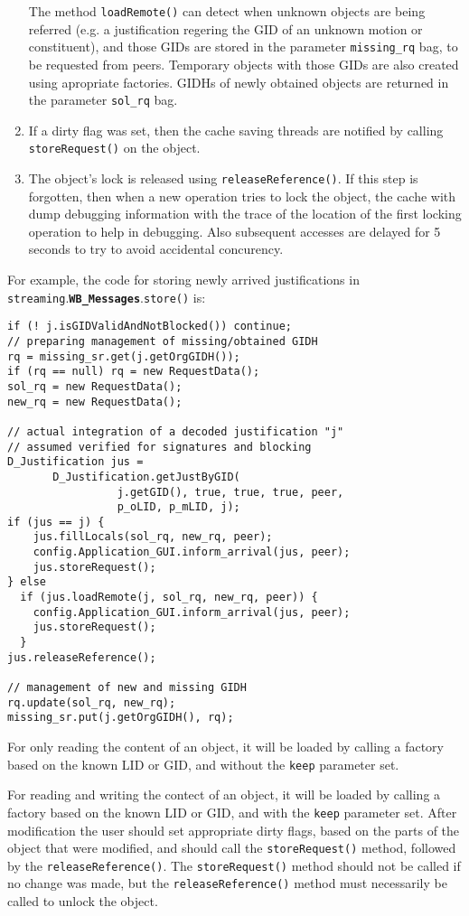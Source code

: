 \documentclass{book}
\newcommand{\pkg}[1]{{\tt #1}}
\newcommand{\cls}[1]{{\tt\bf #1}}
\newcommand{\mth}[1]{{\tt #1}}
\newcommand{\mmb}[1]{{\tt #1}}
\begin{document}
\begin{enumerate}
The method \mth{loadRemote()} can detect when unknown objects are being referred (e.g. a justification regering the GID
of an unknown motion or constituent), and those GIDs are stored in the parameter \mmb{missing\_rq} bag,
to be requested from peers. Temporary objects with those GIDs are also created using apropriate factories.
GIDHs of newly obtained objects are returned in the parameter \mmb{sol\_rq} bag.
\item
If a dirty flag was set, then the cache saving threads are notified by calling \mth{storeRequest()} on the object.
\item
The object's lock is released using \mth{releaseReference()}. If this step is forgotten,
then when a new operation tries to lock the object, the cache with dump debugging information with the trace of the location
of the first locking operation to help in debugging. Also subsequent accesses are delayed for 5 seconds to try to avoid
accidental concurency.
\end{enumerate}

For example, the code for storing newly arrived justifications in \pkg{streaming}.\cls{WB\_Messages}.\mth{store()} is:

\begin{verbatim}
if (! j.isGIDValidAndNotBlocked()) continue;
// preparing management of missing/obtained GIDH
rq = missing_sr.get(j.getOrgGIDH());
if (rq == null) rq = new RequestData();
sol_rq = new RequestData();
new_rq = new RequestData();

// actual integration of a decoded justification "j" 
// assumed verified for signatures and blocking
D_Justification jus = 
       D_Justification.getJustByGID(
                 j.getGID(), true, true, true, peer, 
                 p_oLID, p_mLID, j);
if (jus == j) {
    jus.fillLocals(sol_rq, new_rq, peer);
    config.Application_GUI.inform_arrival(jus, peer);
    jus.storeRequest();
} else
  if (jus.loadRemote(j, sol_rq, new_rq, peer)) {
    config.Application_GUI.inform_arrival(jus, peer);
    jus.storeRequest();
  }
jus.releaseReference();

// management of new and missing GIDH
rq.update(sol_rq, new_rq);
missing_sr.put(j.getOrgGIDH(), rq);			
\end{verbatim}

For only reading the content of an object, it will be loaded by calling a factory based on the known LID or GID,
and without the \mth{keep} parameter set.

For reading and writing the contect of an object, it will be loaded by calling a factory based on the known LID or GID,
and with the \mth{keep} parameter set. After modification the user should set appropriate dirty flags, based on the parts of the object
that were modified, and should call the \mth{storeRequest()} method, followed by the \mth{releaseReference()}.
The \mth{storeRequest()} method should not be called if no change was made, but the \mth{releaseReference()} method must
necessarily be called to unlock the object.
\end{document}
